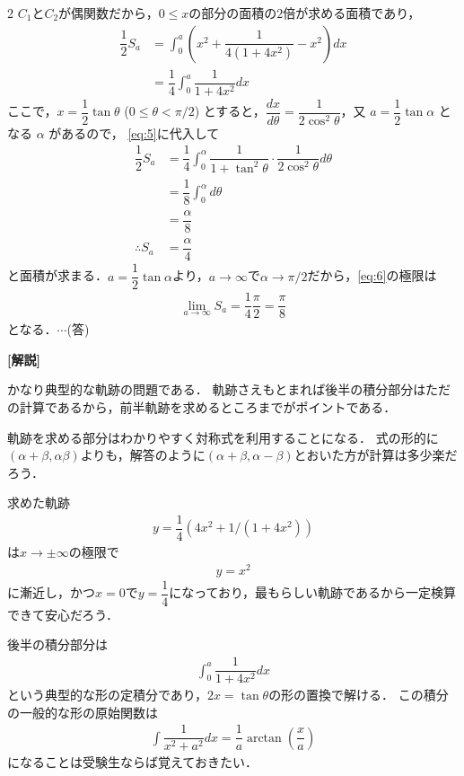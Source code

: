 \documentclass[../../main.tex]{subfiles}
\begin{document}
\begin{multicols}{2}
  $C_1$と$C_2$が偶関数だから，$0\le x$の部分の面積の$2$倍が求める面積であり，
  \begin{align}
    \dfrac{1}{2}S_a
    & = \int_0^a \left(x^2+\dfrac{1}{4(1+4x^2)} - x^2 \right)dx \nonumber \\
    & = \dfrac{1}{4}\int_{0}^{a} \dfrac{1}{1+4x^2} dx \label{eq:5}
  \end{align}
  ここで，$x=\dfrac{1}{2}\tan\theta$ ($0 \le \theta < \pi/2$) とすると，$\dfrac{dx}{d\theta} = \dfrac{1}{2\cos^2\theta}$，又 $a = \dfrac{1}{2}\tan \alpha$ となる $\alpha$ があるので，
  \cref{eq:5}に代入して
  \begin{align}
    \dfrac{1}{2}S_a
    & = \dfrac{1}{4}\int_{0}^{\alpha} \dfrac{1}{1+\tan^2\theta} \cdot \dfrac{1}{2\cos^2\theta} d\theta
    \nonumber                                                                                           \\
    & = \dfrac{1}{8}\int_{0}^{\alpha} d\theta \nonumber                                              \\
    & = \dfrac{\alpha}{8} \nonumber                                                                  \\
    \therefore
    S_a & = \dfrac{\alpha}{4} \label{eq:6}
  \end{align}
  と面積が求まる．$a = \dfrac{1}{2}\tan \alpha$より，$a\to\infty$で$\alpha\to\pi/2$だから，\cref{eq:6}の極限は
  \begin{align}
    \lim_{a\to\infty} S_a = \dfrac{1}{4} \dfrac{\pi}{2} = \dfrac{\pi}{8}
  \end{align}
  となる．$\cdots$(答)

  {\bf [解説]}

  かなり典型的な軌跡の問題である．
  軌跡さえもとまれば後半の積分部分はただの計算であるから，前半軌跡を求めるところまでがポイントである．

  軌跡を求める部分はわかりやすく対称式を利用することになる．
  式の形的に$(\alpha+\beta,\alpha\beta)$よりも，解答のように$(\alpha+\beta,\alpha-\beta)$とおいた方が計算は多少楽だろう．

  求めた軌跡
  \begin{align}
    y =  \dfrac{1}{4}\left(4x^2+1/(1+4x^2)\right)
  \end{align}
  は$x\to\pm\infty$の極限で
  \begin{align}
    y = x^2
  \end{align}
  に漸近し，かつ$x=0$で$y=\dfrac{1}{4}$になっており，最もらしい軌跡であるから一定検算できて安心だろう．

  後半の積分部分は
  \begin{align}
    \int_{0}^{a} \dfrac{1}{1+4x^2} dx
  \end{align}
  という典型的な形の定積分であり，$2x=\tan\theta$の形の置換で解ける．
  この積分の一般的な形の原始関数は
  \begin{align}
    \int \dfrac{1}{x^2+a^2} dx = \dfrac{1}{a} \arctan\left(\dfrac{x}{a}\right)
  \end{align}
  になることは受験生ならば覚えておきたい．

  \newpage
\end{multicols}
\end{document}
